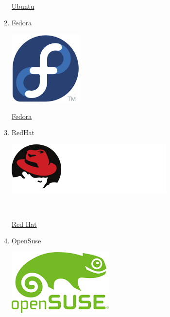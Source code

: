 \documentclass[11pt]{article}
\begin{document}
\begin{enumerate}
\href{https://www.ubuntu.com/}{Ubuntu}

\item Fedora
\label{sec:orgc8e90f0}
\begin{center}
\includegraphics[width=.9\linewidth]{Versiones/fedora.png}
\end{center}

\href{https://getfedora.org/es/}{Fedora}

\item RedHat
\label{sec:org4cc6058}
\begin{center}
\includegraphics[width=.9\linewidth]{Versiones/redhat.svg.png}
\end{center}  

\href{https://www.redhat.com/es}{Red Hat}

\item OpenSuse
\label{sec:org869bf85}
\begin{center}
\includegraphics[width=.9\linewidth]{Versiones/opensuse.png}
\end{center}  


\end{enumerate}
\end{document}
